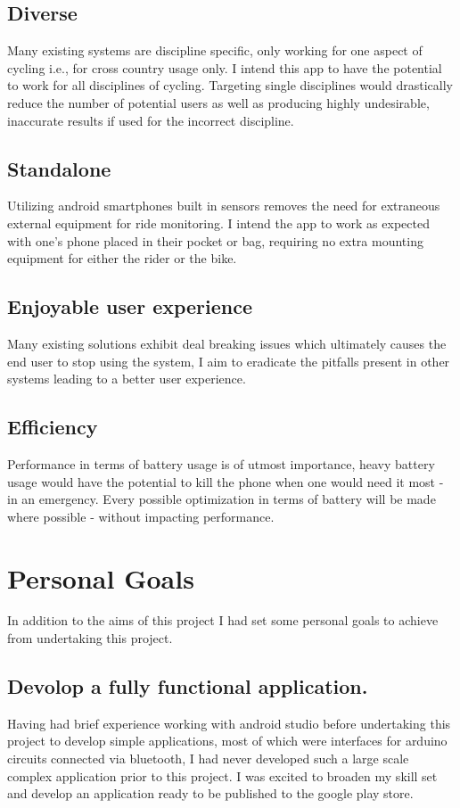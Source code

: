 \subsection*{Diverse}
Many existing systems are discipline specific, only working for one aspect of cycling i.e., for cross country usage only. I intend this app to have the potential to work for all disciplines of cycling. Targeting single disciplines would drastically reduce the number of potential users as well as producing highly undesirable, inaccurate results if used for the incorrect discipline.

\subsection*{Standalone}
Utilizing android smartphones built in sensors removes the need for extraneous external equipment for ride monitoring.  I intend the app to work as expected with one's phone placed in their pocket or bag, requiring no extra mounting equipment for either the rider or the bike.

\subsection*{Enjoyable user experience}
Many existing solutions exhibit deal breaking issues which ultimately causes the end user to stop using the system, I aim to eradicate the pitfalls present in other systems leading to a better user experience. 

\subsection*{Efficiency}
Performance in terms of battery usage is of utmost importance, heavy battery usage would have the potential to kill the phone when one would need it most - in an emergency. Every possible optimization in terms of battery will be made where possible - without impacting performance.

\section{Personal Goals}
In addition to the aims of this project I had set some personal goals to achieve from undertaking this project.

\subsection*{Devolop a fully functional application.}
Having had brief experience working with android studio before undertaking this project to develop simple applications, most of which were interfaces for arduino circuits connected via bluetooth, I had never developed such a large scale complex application prior to this project. I was excited to broaden my skill set and develop an application ready to be published to the google play store. 

